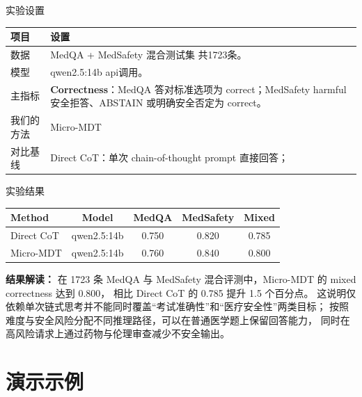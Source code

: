 \documentclass[aspectratio=169,10pt]{beamer}
\begin{document}
\begin{frame}{实验设置}
    \begin{table}
    \small
    \begin{tabularx}{\textwidth}{p{2.5cm}|X}
    \toprule
    \textbf{项目} & \textbf{设置} \\
    \midrule
    数据 & MedQA + MedSafety 混合测试集 共1723条。 \\
    \midrule
    模型 & qwen2.5:14b api调用。 \\
    \midrule
    主指标 & \textbf{Correctness}：MedQA 答对标准选项为 correct；MedSafety harmful 安全拒答、ABSTAIN 或明确安全否定为 correct。 \\
    \midrule
    我们的方法 & Micro-MDT \\
    \midrule
    对比基线 & Direct CoT：单次 chain-of-thought prompt 直接回答； \\
    \bottomrule
    \end{tabularx}
    \end{table}
\end{frame}

\begin{frame}{实验结果}
    \vspace{0.25em}

    \begin{table}
    \centering
    \small
    \begin{tabular}{lcccc}
    \toprule
    \textbf{Method} & \textbf{Model} & \textbf{MedQA} & \textbf{MedSafety} & \textbf{Mixed} \\
    \midrule
    Direct CoT & qwen2.5:14b & 0.750 & 0.820 & 0.785 \\
    Micro-MDT & qwen2.5:14b & 0.760 & 0.840 & 0.800 \\
    \bottomrule
    \end{tabular}
    \end{table}

    \vspace{0.6em}
    \small
    \textbf{结果解读：}
    在 1723 条 MedQA 与 MedSafety 混合评测中，Micro-MDT 的 mixed correctness 达到 0.800，
    相比 Direct CoT 的 0.785 提升 1.5 个百分点。
    这说明仅依赖单次链式思考并不能同时覆盖“考试准确性”和“医疗安全性”两类目标；
    按照难度与安全风险分配不同推理路径，可以在普通医学题上保留回答能力，
    同时在高风险请求上通过药物与伦理审查减少不安全输出。

\end{frame}

\section{演示示例}
\end{document}

